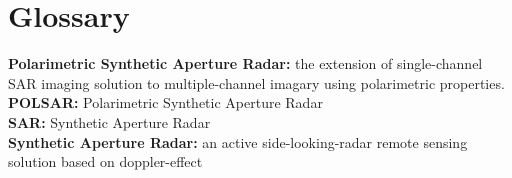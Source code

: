 \documentclass[a4paper, oneside, 11pt]{Latex/Classes/PhDthesisPSnPDF}
\begin{document}





	








\chapter*{Glossary}

\label{glossary} %

\begin{multicols}{2}
  


{\bf Polarimetric Synthetic Aperture Radar:} the extension of single-channel SAR imaging solution to multiple-channel imagary using polarimetric properties.\\

{\bf POLSAR:} Polarimetric Synthetic Aperture Radar \\

{\bf SAR:} Synthetic Aperture Radar\\

{\bf Synthetic Aperture Radar:} an active side-looking-radar remote sensing solution based on doppler-effect\\


\end{multicols}
\end{document}
